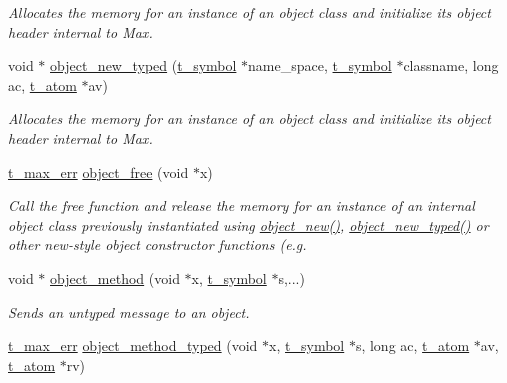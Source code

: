 \begin{DoxyCompactItemize}
\begin{DoxyCompactList}\small\item\em Allocates the memory for an instance of an object class and initialize its object header {\itshape internal to Max\/}. \item\end{DoxyCompactList}\item 
void $\ast$ \hyperlink{group__obj_ga459c71aca6316e345379eeb424ad56ff}{object\_\-new\_\-typed} (\hyperlink{structt__symbol}{t\_\-symbol} $\ast$name\_\-space, \hyperlink{structt__symbol}{t\_\-symbol} $\ast$classname, long ac, \hyperlink{structt__atom}{t\_\-atom} $\ast$av)
\begin{DoxyCompactList}\small\item\em Allocates the memory for an instance of an object class and initialize its object header {\itshape internal to Max\/}. \item\end{DoxyCompactList}\item 
\hyperlink{group__datatypes_ga73edaae82b318855cc09fac994918165}{t\_\-max\_\-err} \hyperlink{group__obj_ga3759846cb356195532c41e35b87522ee}{object\_\-free} (void $\ast$x)
\begin{DoxyCompactList}\small\item\em Call the free function and release the memory for an instance of an internal object class previously instantiated using \hyperlink{group__obj_gac4b370265c776db4f545d257089af1cf}{object\_\-new()}, \hyperlink{group__obj_ga459c71aca6316e345379eeb424ad56ff}{object\_\-new\_\-typed()} or other new-\/style object constructor functions (e.g. \item\end{DoxyCompactList}\item 
void $\ast$ \hyperlink{group__obj_gae740749094827ac5adc2b7145db1c596}{object\_\-method} (void $\ast$x, \hyperlink{structt__symbol}{t\_\-symbol} $\ast$s,...)
\begin{DoxyCompactList}\small\item\em Sends an untyped message to an object. \item\end{DoxyCompactList}\item 
\hyperlink{group__datatypes_ga73edaae82b318855cc09fac994918165}{t\_\-max\_\-err} \hyperlink{group__obj_ga443dee482af22e0fe83e68955d367226}{object\_\-method\_\-typed} (void $\ast$x, \hyperlink{structt__symbol}{t\_\-symbol} $\ast$s, long ac, \hyperlink{structt__atom}{t\_\-atom} $\ast$av, \hyperlink{structt__atom}{t\_\-atom} $\ast$rv)

\end{DoxyCompactItemize}
